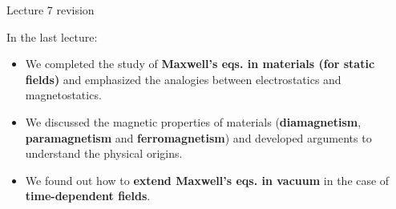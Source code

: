 
\renewcommand{\summarizedlecture}{7 }

%
%
%

\begin{frame}{Lecture \summarizedlecture revision}

In the last lecture:\\

\begin{itemize}

   \item We completed the study of {\bf Maxwell's eqs. in materials (for static fields)}
             and emphasized the analogies between electrostatics and magnetostatics.

   \vspace{0.2cm}

   \item We discussed the magnetic properties of materials
             ({\bf diamagnetism}, {\bf paramagnetism} and {\bf ferromagnetism})
             and developed arguments to understand the physical origins.

   \vspace{0.2cm}

   \item We found out how to {\bf extend Maxwell's eqs. in vacuum}
             in the case of {\bf time-dependent fields}.

\end{itemize}

\end{frame}

%
%
%

